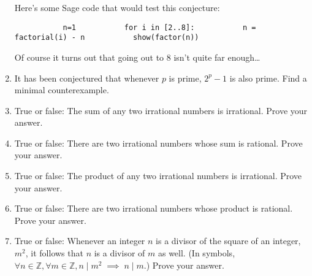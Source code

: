 \documentclass[10pt,]{book}
\theoremstyle{plain}
\theoremstyle{definition}
\theoremstyle{definition}
\numberwithin{equation}{section}
\newcommand{\hint}[1]{ }
\newcommand{\Integers}{{\mathbb Z}}
\begin{document}
\begin{enumerate}[label=(\alph*)]
{          Here's some Sage code that would test this conjecture:

          \lstinline?
          n=1
          for i in [2..8]:
          n = factorial(i) - n
          show(factor(n))
          ?

          Of course it turns out that going out to \(8\) isn't quite far enough\dots{}

          }
\item\hypertarget{li-265}{}
          It has been conjectured that whenever \(p\) is prime, \(2^p - 1\) is
          also prime.  Find a minimal counterexample.

          \hint{I would definitely seek help at your friendly neighborhood CAS.  In Sage 
          you can loop over the first several prime numbers using the following syntax.

          \lstinline?for p in [2,3,5,7,11,13]:?

           If you want to automate that somewhat, there is a Sage function that returns a list
          of all the primes in some range.  So the following does the same thing.

          \lstinline?for p in primes(2,13):?
          }
\item\hypertarget{li-266}{}
          True or false:  The sum of any two irrational numbers is irrational.
          Prove your answer.

          \hint{This statement and the next are negations of one another.  Your answers should reflect that.}
\item\hypertarget{li-267}{}
          True or false:  There are two irrational numbers whose sum is rational.
          Prove your answer.

          \hint{If a number is irrational, isn't its negative also irrational?  That's actually a pretty huge hint.}
\item\hypertarget{li-268}{}
          True or false: The product of any two irrational numbers is irrational.
          Prove your answer.

          \hint{This one and the next are negations too. Aren't they?}
\item\hypertarget{li-269}{}
          True or false: There are two irrational numbers whose product is rational.
          Prove your answer.

          \hint{The two numbers \emph{could} be equal couldn't they?}
\item\hypertarget{li-270}{}
          True or false:  Whenever an integer \(n\) is a divisor of the square of an integer, \(m^2\), it follows that \(n\) is a divisor of \(m\) as well.
          (In symbols, \(\forall n \in \Integers, \forall m \in \Integers, n \mid m^2 \; \implies \; n \mid m\).)
          Prove your answer.


\end{enumerate}
\end{document}
